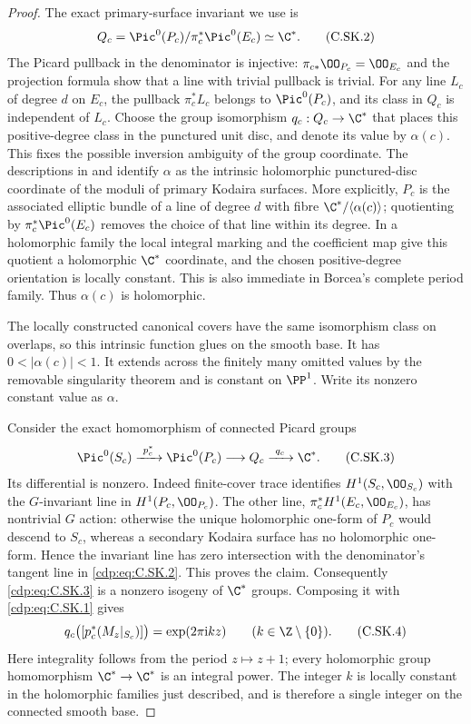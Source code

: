 \begin{proof}
The exact primary-surface invariant we use is
\[
 Q_c=\Pic^0(P_c)/\pi_c^*\Pic^0(E_c)\simeq\C^*.
\tag{C.SK.2}\label{cdp:eq:C.SK.2}
\]
The Picard pullback in the denominator is injective:
$\pi_{c*}\OO_{P_c}=\OO_{E_c}$ and the projection formula
show that a line with trivial pullback is trivial. For
any line $L_c$ of degree $d$ on $E_c$, the pullback
$\pi_c^*L_c$ belongs to $\Pic^0(P_c)$, and its class in
$Q_c$ is independent of $L_c$. Choose the group
isomorphism $q_c:Q_c\to\C^*$ that places this
positive-degree class in the punctured unit disc, and
denote its value by $\alpha(c)$.
This fixes the possible inversion ambiguity of the
group coordinate. The descriptions in
\cite[Theorem~4 and Remark~1]{Borcea1984} and
\cite[\S1, pp.~2--3]{SS2002} identify $\alpha$ as the
intrinsic holomorphic punctured-disc coordinate of the
moduli of primary Kodaira surfaces. More explicitly,
$P_c$ is the associated elliptic bundle of a line of
degree $d$ with fibre $\C^*/\langle\alpha(c)\rangle$;
quotienting by $\pi_c^*\Pic^0(E_c)$ removes the choice
of that line within its degree. In a holomorphic
family the local integral marking and the coefficient
map give this quotient a holomorphic $\C^*$ coordinate,
and the chosen positive-degree orientation is locally
constant. This is also immediate in Borcea's complete
period family. Thus $\alpha(c)$ is holomorphic.

The locally constructed canonical covers have the same
isomorphism class on overlaps, so this intrinsic
function glues on the smooth base. It has
$0<|\alpha(c)|<1$. It extends across the finitely many
omitted values by the removable singularity theorem
and is constant on $\PP^1$. Write its nonzero constant
value as $\alpha$.

Consider the exact homomorphism of connected Picard
groups
\[
 \Pic^0(S_c)\xrightarrow{\ p_c^*\ }\Pic^0(P_c)
          \longrightarrow Q_c\xrightarrow{\ q_c\ }\C^*.
\tag{C.SK.3}\label{cdp:eq:C.SK.3}
\]
Its differential is nonzero. Indeed finite-cover trace
identifies $H^1(S_c,\OO_{S_c})$ with the $G$-invariant
line in $H^1(P_c,\OO_{P_c})$. The other line,
$\pi_c^*H^1(E_c,\OO_{E_c})$, has nontrivial $G$ action:
otherwise the unique holomorphic one-form of $P_c$
would descend to $S_c$, whereas a secondary Kodaira
surface has no holomorphic one-form. Hence the invariant
line has zero intersection with the denominator's
tangent line in \eqref{cdp:eq:C.SK.2}. This proves the claim.
Consequently \eqref{cdp:eq:C.SK.3} is a nonzero isogeny of $\C^*$
groups. Composing it with \eqref{cdp:eq:C.SK.1} gives
\[
 q_c\bigl([p_c^*(M_z|_{S_c})]\bigr)
       =\exp(2\pi\mathrm i k z)
       \qquad(k\in\Z\setminus\{0\}).
\tag{C.SK.4}\label{cdp:eq:C.SK.4}
\]
Here integrality follows from the period $z\mapsto z+1$;
every holomorphic group homomorphism $\C^*\to\C^*$ is
an integral power. The integer $k$ is locally constant
in the holomorphic families just described, and is
therefore a single integer on the connected smooth base.


\end{proof}
